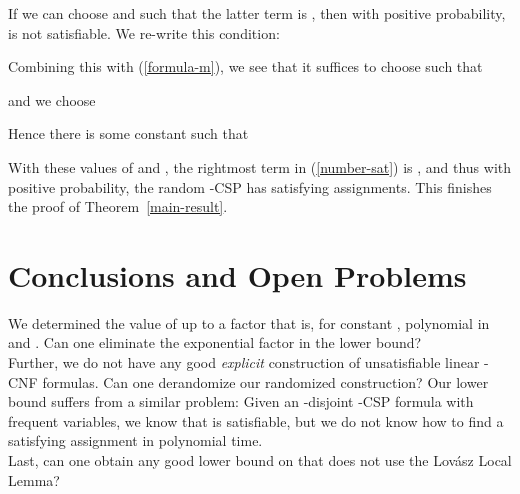 \documentclass[envcountsect, envcountsame]{llncs}
\begin{document}
If we can choose  and  such that the latter term is ,
then with positive probability,  is not satisfiable. We re-write
this condition:

Combining this with (\ref{formula-m}), we see that it suffices
to choose  such that

and we choose

Hence there is some constant 
such that


With these values of  and , the rightmost term in
(\ref{number-sat}) is , and thus with positive probability,
the random -CSP  has  satisfying assignments.
This finishes the proof of Theorem~\ref{main-result}.\\

\section{Conclusions and Open Problems}

We determined the value of  up to a factor that is,
for constant , polynomial in  and . Can one eliminate
the exponential factor  in the lower bound? \\

Further, we do not have any good {\em explicit} construction of
unsatisfiable linear -CNF formulas. Can one derandomize our
randomized construction? Our lower bound suffers from a similar
problem: Given an -disjoint  -CSP formula  with  frequent
variables, we know that  is satisfiable, but we do not know how to
find a satisfying assignment in polynomial time.\\

Last, can one obtain any good lower bound on  that does
not use the Lov\'asz Local Lemma? 




\end{document}
